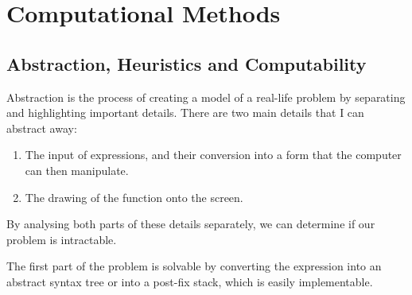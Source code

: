 \documentclass[../../../main.tex]{subfiles}
\begin{document}
\chapter{Computational Methods}

\section{Abstraction, Heuristics and Computability}\label{sec:computability}
Abstraction is the process of creating a model of a real-life problem by separating and highlighting important details. There are two main details that I can abstract away:
\begin{enumerate}
\item The input of expressions, and their conversion into a form that the computer can then manipulate.
\item The drawing of the function onto the screen.
\end{enumerate}
By analysing both parts of these details separately, we can determine if our problem is intractable.

The first part of the problem is solvable by converting the expression into an abstract syntax tree or into a post-fix stack, which is easily implementable.
\end{document}
